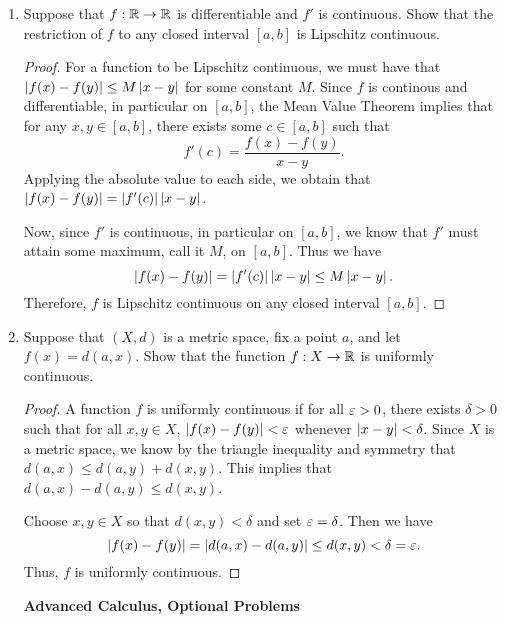 \documentclass[12pt]{article}
\theoremstyle{plain}
\begin{document}
\begin{enumerate}
    \item Suppose that $f:\mathbb{R} \rightarrow \mathbb{R}$ is differentiable and $f'$ is continuous.
    Show that the restriction of $f$ to any closed interval $[a,b]$ is Lipschitz continuous.

    \begin{proof}
        For a function to be Lipschitz continuous, we must have that $\left| f(x)-f(y) \right| \leq M\left| x-y \right|$ for some constant $M$.
        Since $f$ is continous and differentiable, in particular on $[a,b]$, the Mean Value Theorem implies that for any $x,y\in [a,b]$, there exists some $c\in [a,b]$ such that
        \[
            f'(c) = \frac{f(x)-f(y)}{x-y}.
        \]
        Applying the absolute value to each side, we obtain that $\left| f(x)-f(y) \right| = \left| f'(c) \right|\left| x-y \right|$.

        Now, since $f'$ is continuous, in particular on $[a,b]$, we know that $f'$ must attain some maximum, call it $M$, on $[a,b]$.
        Thus we have
        \[
            \left| f(x)-f(y) \right| = \left| f'(c) \right|\left| x-y \right| \leq M\left| x-y \right|.
        \]
        Therefore, $f$ is Lipschitz continuous on any closed interval $[a,b]$.
    \end{proof}

    \newpage\item Suppose that $(X,d)$ is a metric space, fix a point $a$, and let $f(x) = d(a,x)$.
    Show that the function $f: X \rightarrow \mathbb{R}$ is uniformly continuous.

    \begin{proof}
        A function $f$ is uniformly continuous if for all $\varepsilon > 0$, there exists $\delta >0$ such that for all $x,y\in X$, $\left| f(x)-f(y) \right| < \varepsilon$ whenever $\left| x-y \right| < \delta$.
        Since $X$ is a metric space, we know by the triangle inequality and symmetry that $d(a,x) \leq d(a,y) + d(x,y)$.
        This implies that $d(a,x)-d(a,y) \leq d(x,y)$.
        
        Choose $x,y\in X$ so that $d(x,y) < \delta$ and set $\varepsilon = \delta$. 
        Then we have
        \[
            \left| f(x) - f(y) \right| = \left| d(a,x)-d(a,y) \right| \leq d(x,y) < \delta = \varepsilon.
        \]
        Thus, $f$ is uniformly continuous.
    \end{proof}

\newpage
\begin{center}
    {\bf\Large Advanced Calculus, Optional Problems}
\end{center}    


\end{enumerate}
\end{document}
